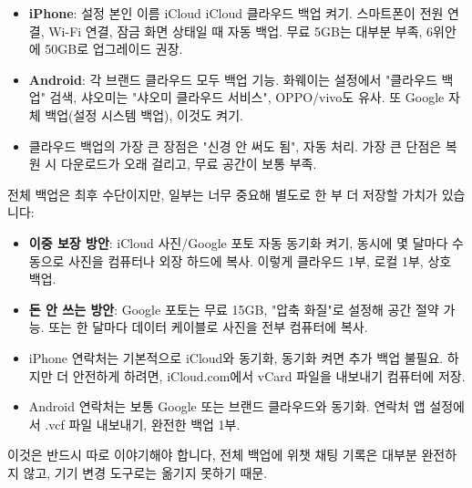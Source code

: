 
\begin{itemize}
  \item \textbf{iPhone}: 설정 본인 이름 iCloud iCloud 클라우드 백업 켜기. 스마트폰이 전원 연결, Wi-Fi 연결, 잠금 화면 상태일 때 자동 백업. 무료 5GB는 대부분 부족, 6위안에 50GB로 업그레이드 권장.
  \item \textbf{Android}: 각 브랜드 클라우드 모두 백업 기능. 화웨이는 설정에서 "클라우드 백업" 검색, 샤오미는 "샤오미 클라우드 서비스", OPPO/vivo도 유사. 또 Google 자체 백업(설정 시스템 백업), 이것도 켜기.
  \item 클라우드 백업의 가장 큰 장점은 "신경 안 써도 됨", 자동 처리. 가장 큰 단점은 복원 시 다운로드가 오래 걸리고, 무료 공간이 보통 부족.
\end{itemize}


전체 백업은 최후 수단이지만, 일부는 너무 중요해 별도로 한 부 더 저장할 가치가 있습니다:


\begin{itemize}
  \item \textbf{이중 보장 방안}: iCloud 사진/Google 포토 자동 동기화 켜기, 동시에 몇 달마다 수동으로 사진을 컴퓨터나 외장 하드에 복사. 이렇게 클라우드 1부, 로컬 1부, 상호 백업.
  \item \textbf{돈 안 쓰는 방안}: Google 포토는 무료 15GB, "압축 화질"로 설정해 공간 절약 가능. 또는 한 달마다 데이터 케이블로 사진을 전부 컴퓨터에 복사.
\end{itemize}


\begin{itemize}
  \item iPhone 연락처는 기본적으로 iCloud와 동기화, 동기화 켜면 추가 백업 불필요. 하지만 더 안전하게 하려면, iCloud.com에서 vCard 파일을 내보내기 컴퓨터에 저장.
  \item Android 연락처는 보통 Google 또는 브랜드 클라우드와 동기화. 연락처 앱 설정에서 .vcf 파일 내보내기, 완전한 백업 1부.
\end{itemize}


이것은 반드시 따로 이야기해야 합니다, 전체 백업에 위챗 채팅 기록은 대부분 완전하지 않고, 기기 변경 도구로는 옮기지 못하기 때문.

